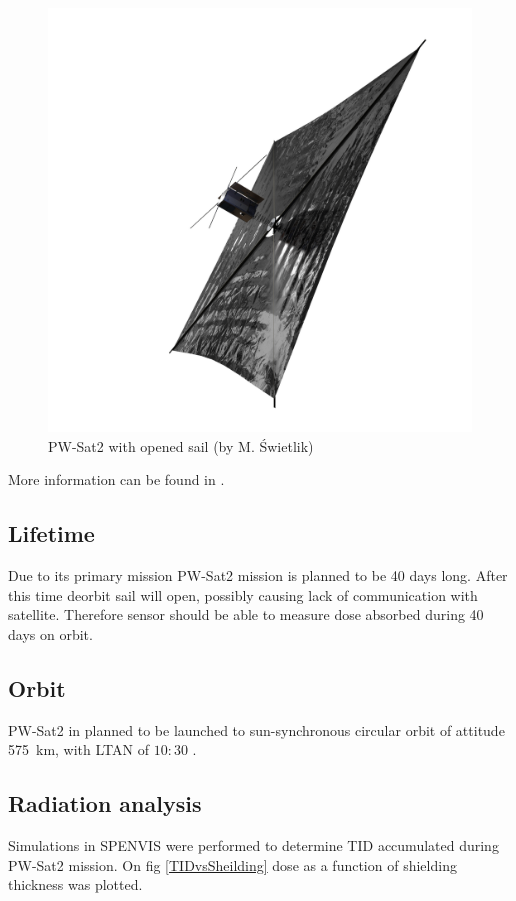 	\begin{figure}[H]
		\centering
		\includegraphics[width=0.7\paperwidth]{img/PW-Sat2_render_02.png}
		\caption{PW-Sat2 with opened sail (by M. Świetlik)}
		\label{PW-Sat_render_sail}
	\end{figure}
	
	More information can be found in \cite{DDC_article}.
	
\subsection{Lifetime}
	Due to its primary mission PW-Sat2 mission is planned to be 40 days long. After this time deorbit sail will open, possibly causing lack of communication with satellite. Therefore sensor should be able to measure dose absorbed during 40 days on orbit.
	
\subsection{Orbit}
	PW-Sat2 in planned to be launched to sun-synchronous circular orbit of attitude \SI{575}{km}, with LTAN of $10:30$ \cite{PWSAT_MA_CDR}.
	

\subsection{Radiation analysis}
	Simulations in SPENVIS \cite{SPENVIS_URL} were performed to determine TID accumulated during PW-Sat2 mission. On fig \ref{TIDvsSheilding} dose as a function of shielding thickness was plotted.

